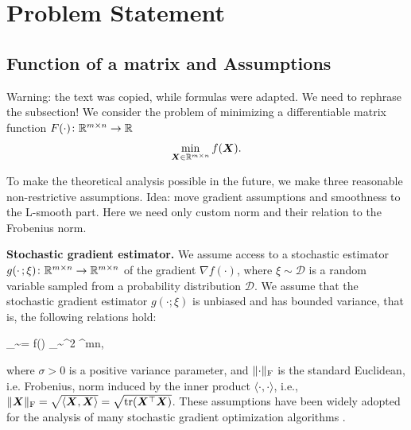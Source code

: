 \documentclass{article} %
\newcommand{\Rmn}{\R^{m\times n}}
\newcommand{\cD}{\mathcal{D}}
\newcommand{\Ed}[2]{\mathbb{E}_{#1}\left[#2\right]}
\DeclarePairedDelimiter{\normf}{\|}{\|_\mathrm{F}}
\DeclarePairedDelimiter{\sqnf}{\|}{\|_{\mathrm{F}}^2}
\def\<#1,#2>{\langle #1,#2\rangle}
\newcounter{aequation}
\DeclareMathOperator{\tr}{tr}
\begin{document}
\section{Problem Statement}
\subsection{Function of a matrix and Assumptions}
    Warning: the text was copied, while formulas were adapted. We need to rephrase the subsection! 
    We consider the problem of minimizing a differentiable matrix function $F(\cdot)\colon \Rmn \to \R$
    \begin{equation}\label{eq:mat}
        \min_{\mX \in \Rmn} f(\mX).
    \end{equation}

    To make the theoretical analysis possible in the future, we make three reasonable non-restrictive assumptions.
    Idea: move gradient assumptions and smoothness to the L-smooth part. Here we need only custom norm and their relation to the Frobenius norm.

{\bf Stochastic gradient estimator.}
    We assume access to a stochastic estimator $g(\cdot\,;\xi)\colon \Rmn \to \Rmn$ of the gradient $\nabla f(\cdot)$, where $\xi \sim \cD$ is a random variable sampled from a probability distribution $\cD$. We assume that the stochastic gradient estimator $g(\cdot;\xi)$ is unbiased and has bounded variance, that is, the following relations hold:
    \begin{aequation}\label{eq:variance}
    \Ed{\xi \sim \cD}{g(\mX;\xi)} = \nabla f(\mX)
    \quad{}\quad
    \Ed{\xi \sim \cD}{\sqnf{g(\mX;\xi) - \nabla f(\mX)}} \leq \sigma^2
    \quad{}\;
    \mX \in \Rmn,
    \end{aequation}
    where $\sigma > 0$ is a positive variance parameter, and $\normf{\cdot}$ is the standard Euclidean, i.e. Frobenius, norm induced by the inner product $\<\cdot,\cdot>$, i.e., $\normf{\mX} = \sqrt{\<\mX,\mX>}=\sqrt{\tr(\mX^\top \mX)}$. These assumptions have been widely adopted for the analysis of many stochastic gradient optimization algorithms \citep{ghadimi2013stochastic,ghadimi2016accelerated,cutkosky2020momentum,sun2023momentum,horvath2023stochastic,gorbunov2020linearly}.
\end{document}
